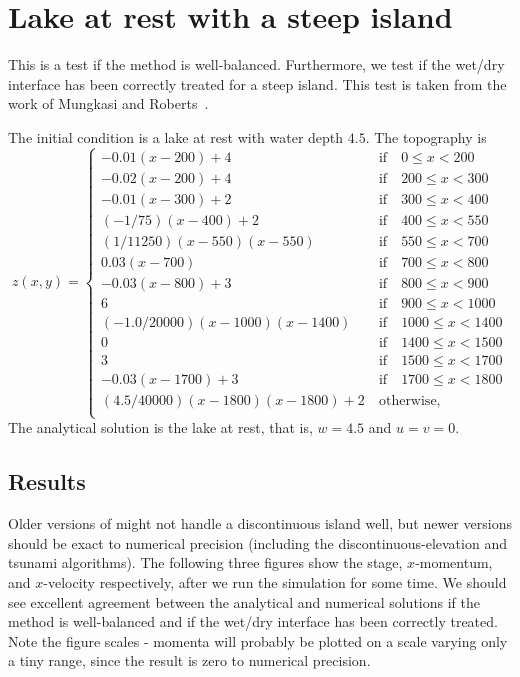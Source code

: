 
\section{Lake at rest with a steep island}

This is a test if the method is well-balanced. Furthermore, we test if the wet/dry interface has been correctly treated for a steep island. This test is taken from the work of Mungkasi and Roberts~\cite{MR2010}.

The initial condition is a lake at rest with water depth $4.5$. The topography is
\begin{equation}
z(x,y)= \left\{ \begin{array}{ll}
             -0.01(x-200) + 4& ~\textrm{if}\quad 0 \leq x < 200\\
             -0.02(x-200) + 4& ~\textrm{if}\quad 200 \leq x < 300\\
             -0.01(x-300) + 2& ~\textrm{if}\quad 300 \leq x < 400\\
             (-1/75)(x-400) + 2& ~\textrm{if}\quad 400 \leq x < 550\\
             (1/11250)(x-550)(x-550)& ~\textrm{if}\quad 550 \leq x < 700\\
             0.03(x-700)& ~\textrm{if}\quad 700 \leq x < 800\\
             -0.03(x-800) + 3& ~\textrm{if}\quad 800 \leq x < 900\\
             6& ~\textrm{if}\quad 900 \leq x < 1000\\
             (-1.0/20000)(x-1000)(x-1400)& ~\textrm{if}\quad 1000 \leq x < 1400\\
             0& ~\textrm{if}\quad 1400 \leq x < 1500\\
             3& ~\textrm{if}\quad 1500 \leq x < 1700\\
             -0.03(x-1700) + 3& ~\textrm{if}\quad 1700 \leq x < 1800\\
             (4.5/40000)(x-1800)(x-1800) + 2 & ~\textrm{otherwise,}\\
\end{array} \right.
\end{equation} 
The analytical solution is the lake at rest, that is, $w=4.5$ and $u=v=0$.

\subsection{Results}


Older versions of \anuga{} might not handle a discontinuous island well, but newer versions should be exact to numerical precision (including the discontinuous-elevation and tsunami algorithms). The following three figures show the stage, $x$-momentum, and $x$-velocity respectively, after we run the simulation for some time. We should see excellent agreement between the analytical and numerical solutions if the method is well-balanced and if the wet/dry interface has been correctly treated. Note the figure scales - momenta will probably be plotted on a scale varying only a tiny range, since the result is zero to numerical precision.

